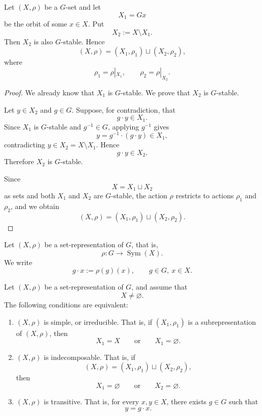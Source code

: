 \begin{proposition}
    Let \((X,\rho)\) be a \(G\)-set and let
    \[
        X_1=Gx
    \]
    be the orbit of some \(x\in X\). Put
    \[
        X_2:=X\setminus X_1.
    \]
    Then \(X_2\) is also \(G\)-stable. Hence
    \[
        (X,\rho)
        =
        (X_1,\rho_1)\sqcup (X_2,\rho_2),
    \]
    where
    \[
        \rho_1=\rho|_{X_1},
        \qquad
        \rho_2=\rho|_{X_2}.
    \]
\end{proposition}

\begin{proof}
    We already know that \(X_1\) is \(G\)-stable. We prove that \(X_2\) is
    \(G\)-stable.

    Let \(y\in X_2\) and \(g\in G\). Suppose, for contradiction, that
    \[
        g\cdot y\in X_1.
    \]
    Since \(X_1\) is \(G\)-stable and \(g^{-1}\in G\), applying \(g^{-1}\) gives
    \[
        y=g^{-1}\cdot (g\cdot y)\in X_1,
    \]
    contradicting \(y\in X_2=X\setminus X_1\). Hence
    \[
        g\cdot y\in X_2.
    \]
    Therefore \(X_2\) is \(G\)-stable.

    Since
    \[
        X=X_1\sqcup X_2
    \]
    as sets and both \(X_1\) and \(X_2\) are \(G\)-stable, the action \(\rho\)
    restricts to actions \(\rho_1\) and \(\rho_2\), and we obtain
    \[
        (X,\rho)
        =
        (X_1,\rho_1)\sqcup (X_2,\rho_2).
    \]
\end{proof}

Let \((X,\rho)\) be a set-representation of \(G\), that is,
\[
    \rho:G\longrightarrow \operatorname{Sym}(X).
\]
We write
\[
    g\cdot x:=\rho(g)(x),
    \qquad g\in G,\ x\in X.
\]

\begin{proposition}
    Let \((X,\rho)\) be a set-representation of \(G\), and assume that
    \[
        X\neq \varnothing.
    \]
    The following conditions are equivalent:
    \begin{enumerate}
        \item \((X,\rho)\) is simple, or irreducible. That is, if
        \((X_1,\rho_1)\) is a subrepresentation of \((X,\rho)\), then
        \[
            X_1=X
            \qquad\text{or}\qquad
            X_1=\varnothing.
        \]

        \item \((X,\rho)\) is indecomposable. That is, if
        \[
            (X,\rho)
            =
            (X_1,\rho_1)\sqcup (X_2,\rho_2),
        \]
        then
        \[
            X_1=\varnothing
            \qquad\text{or}\qquad
            X_2=\varnothing.
        \]

        \item \((X,\rho)\) is transitive. That is, for every \(x,y\in X\), there
        exists \(g\in G\) such that
        \[
            y=g\cdot x.
        \]
    \end{enumerate}
\end{proposition}

